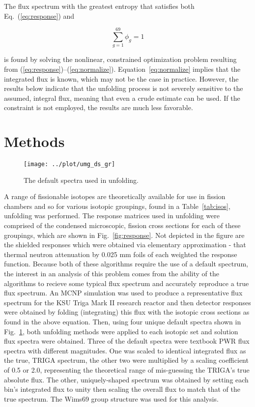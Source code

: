\documentclass[journal]{IEEEtran}
\newcommand{\EQ}[1]{Eq.~(\ref{#1})}               %
\newcommand{\FIG}[1]{Fig.~\ref{#1}}               %
\newcommand{\TAB}[1]{Table~\ref{#1}}              %
\begin{document}
The flux spectrum with the greatest entropy that satisfies both \EQ{eq:response} and

\begin{equation}
 \sum^{69}_{g=1} \phi_g = 1
\label{eq:normalize}
\end{equation}

is found by solving the nonlinear, constrained optimization problem resulting from (\ref{eq:response})--(\ref{eq:normalize}).
Equation~\ref{eq:normalize} implies that the integrated flux is known, which may not be the case in practice.
However, the results below indicate that the unfolding process is not severely sensitive to the assumed, integral flux, meaning that even a crude estimate can be used.
If the constraint is not employed, the results are much less favorable.


\section{Methods}

\begin{figure}[h!tb]
  \centering
  \texttt{[image: ../plot/umg\_ds\_gr]}
  \caption{The default spectra used in unfolding.}
  \label{fig:default_spectra}
\end{figure}

A range of fissionable isotopes are theoretically available for use in fission chambers and so for various isotopic groupings, found in a \TAB{tab:isos}, unfolding was performed.
The response matrices used in unfolding were comprised of the condensed microscopic, fission cross sections for each of these groupings, which are shown in \FIG{fig:response}.
Not depicted in the figure are the shielded responses which were obtained via elementary approximation - that thermal neutron attenuation by 0.025 mm foils of each weighted the response function.
Because both of these algorithms require the use of a default spectrum, the interest in an analysis of this problem comes from the ability of the algorithms to recieve some typical flux spectrum and accurately reproduce a true flux spectrum.
An MCNP simulation was used to produce a representative flux spectrum for the KSU Triga Mark II research reactor and then detector responses were obtained by folding (integrating) this flux with the isotopic cross sections as found in the above equation.
Then, using four unique default spectra shown in \FIG{fig:default_spectra}, both unfolding methods were applied to each isotopic set and solution flux spectra were obtained.
Three of the default spectra were textbook PWR flux spectra with different magnitudes.
One was scaled to identical integrated flux as the true, TRIGA spectrum, the other two were multiplied by a scaling coefficient of 0.5 or 2.0, representing the theoretical range of mis-guessing the TRIGA's true absolute flux.
The other, uniquely-shaped spectrum was obtained by setting each bin's integrated flux to unity then scaling the overall flux to match that of the true spectrum.
The Wims69 group structure was used for this analysis.
\end{document}
